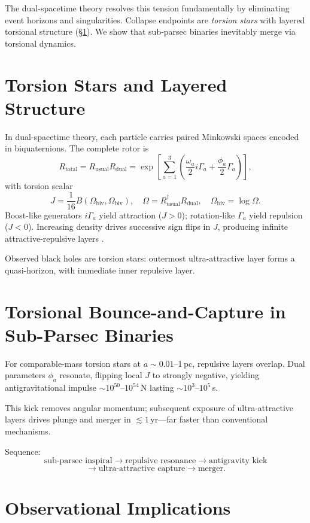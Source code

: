 \documentclass[dvipdfmx,11pt,a4paper]{article}
\begin{document}
The dual-spacetime theory \citep{dual2025} resolves this tension fundamentally by eliminating event horizons and singularities. Collapse endpoints are \emph{torsion stars} with layered torsional structure (§\ref{sec:torsionstars}). We show that sub-parsec binaries inevitably merge via torsional dynamics.

\section{Torsion Stars and Layered Structure}
\label{sec:torsionstars}

In dual-spacetime theory, each particle carries paired Minkowski spaces encoded in biquaternions. The complete rotor is
\[
R_\text{total}=R_\text{usual}R_\text{dual}=\exp\!\left[\sum_{a=1}^3 \left(\frac{\omega_a}{2}i\Gamma_a+\frac{\phi_a}{2}\Gamma_a\right)\right],
\]
with torsion scalar
\[
J=\frac{1}{16}B(\Omega_\text{biv},\Omega_\text{biv}),\quad \Omega=R_\text{usual}^\dagger R_\text{dual},\quad \Omega_\text{biv}=\log\Omega.
\]
Boost-like generators $i\Gamma_a$ yield attraction ($J>0$); rotation-like $\Gamma_a$ yield repulsion ($J<0$). Increasing density drives successive sign flips in $J$, producing infinite attractive-repulsive layers \citep{dual2025}.

Observed black holes are torsion stars: outermost ultra-attractive layer forms a quasi-horizon, with immediate inner repulsive layer.

\section{Torsional Bounce-and-Capture in Sub-Parsec Binaries}

For comparable-mass torsion stars at $a\sim 0.01$--1\,pc, repulsive layers overlap. Dual parameters $\phi_a$ resonate, flipping local $J$ to strongly negative, yielding antigravitational impulse $\sim 10^{50}$--$10^{54}$\,N lasting $\sim 10^{3}$--$10^{5}$\,s.

This kick removes angular momentum; subsequent exposure of ultra-attractive layers drives plunge and merger in $\lesssim 1$\,yr—far faster than conventional mechanisms.

Sequence:
\[
\text{sub-parsec inspiral} \to \text{repulsive resonance} \to \text{antigravity kick}
\]
\[
\to \text{ultra-attractive capture} \to \text{merger}.
\]

\section{Observational Implications}
\end{document}
